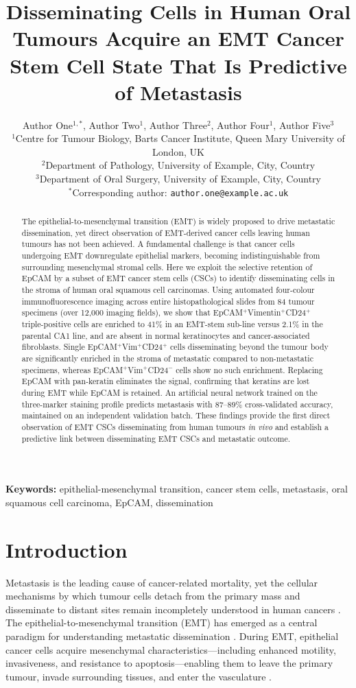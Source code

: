 \documentclass[11pt]{article}
\title{Disseminating Cells in Human Oral Tumours Acquire an EMT Cancer Stem Cell State That Is Predictive of Metastasis}
\author{
Author One$^{1,*}$, Author Two$^{1}$, Author Three$^{2}$, Author Four$^{1}$, Author Five$^{3}$ \\[6pt]
\small $^{1}$Centre for Tumour Biology, Barts Cancer Institute, Queen Mary University of London, UK \\
\small $^{2}$Department of Pathology, University of Example, City, Country \\
\small $^{3}$Department of Oral Surgery, University of Example, City, Country \\
\small $^{*}$Corresponding author: \texttt{author.one@example.ac.uk}
}
\date{}
\begin{document}
\maketitle

\begin{abstract}
The epithelial-to-mesenchymal transition (EMT) is widely proposed to drive metastatic dissemination, yet direct observation of EMT-derived cancer cells leaving human tumours has not been achieved. A fundamental challenge is that cancer cells undergoing EMT downregulate epithelial markers, becoming indistinguishable from surrounding mesenchymal stromal cells. Here we exploit the selective retention of EpCAM by a subset of EMT cancer stem cells (CSCs) to identify disseminating cells in the stroma of human oral squamous cell carcinomas. Using automated four-colour immunofluorescence imaging across entire histopathological slides from 84 tumour specimens (over 12,000 imaging fields), we show that EpCAM$^{+}$Vimentin$^{+}$CD24$^{+}$ triple-positive cells are enriched to 41\% in an EMT-stem sub-line versus 2.1\% in the parental CA1 line, and are absent in normal keratinocytes and cancer-associated fibroblasts. Single EpCAM$^{+}$Vim$^{+}$CD24$^{+}$ cells disseminating beyond the tumour body are significantly enriched in the stroma of metastatic compared to non-metastatic specimens, whereas EpCAM$^{+}$Vim$^{+}$CD24$^{-}$ cells show no such enrichment. Replacing EpCAM with pan-keratin eliminates the signal, confirming that keratins are lost during EMT while EpCAM is retained. An artificial neural network trained on the three-marker staining profile predicts metastasis with 87--89\% cross-validated accuracy, maintained on an independent validation batch. These findings provide the first direct observation of EMT CSCs disseminating from human tumours \textit{in vivo} and establish a predictive link between disseminating EMT CSCs and metastatic outcome.
\end{abstract}

\noindent\textbf{Keywords:} epithelial-mesenchymal transition, cancer stem cells, metastasis, oral squamous cell carcinoma, EpCAM, dissemination

\section{Introduction}

Metastasis is the leading cause of cancer-related mortality, yet the cellular mechanisms by which tumour cells detach from the primary mass and disseminate to distant sites remain incompletely understood in human cancers \citep{Hanahan2011,Lambert2017}. The epithelial-to-mesenchymal transition (EMT) has emerged as a central paradigm for understanding metastatic dissemination \citep{Thiery2002,Nieto2016}. During EMT, epithelial cancer cells acquire mesenchymal characteristics---including enhanced motility, invasiveness, and resistance to apoptosis---enabling them to leave the primary tumour, invade surrounding tissues, and enter the vasculature \citep{Yang2004,Mani2008}.
\end{document}
